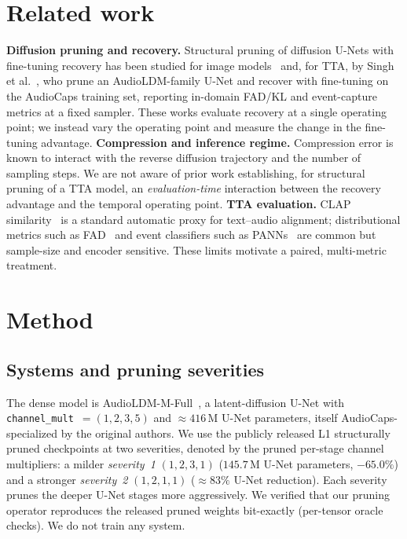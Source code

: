 \documentclass[conference]{IEEEtran}
\begin{document}
\section{Related work}
\textbf{Diffusion pruning and recovery.} Structural pruning of diffusion U-Nets with
fine-tuning recovery has been studied for image models~\cite{fang2023diffpruning,
kim2024bksdm} and, for TTA, by Singh et al.~\cite{singh2026pruning}, who prune an
AudioLDM-family U-Net and recover with fine-tuning on the AudioCaps training set, reporting
in-domain FAD/KL and event-capture metrics at a fixed sampler. These works evaluate
recovery at a single operating point; we instead vary the operating point and measure the
change in the fine-tuning advantage.
\textbf{Compression and inference regime.} Compression error is known to interact with the
reverse diffusion trajectory and the number of sampling steps. We are not aware of prior work
establishing, for structural pruning of a TTA model, an \emph{evaluation-time} interaction
between the recovery advantage and the temporal operating point.
\textbf{TTA evaluation.} CLAP similarity~\cite{wu2023clap} is a standard automatic proxy
for text--audio alignment; distributional metrics such as FAD~\cite{kilgour2019fad} and
event classifiers such as PANNs~\cite{kong2020panns} are common but sample-size and
encoder sensitive. These limits motivate a paired, multi-metric treatment.

\section{Method}
\subsection{Systems and pruning severities}
The dense model is AudioLDM-M-Full~\cite{liu2023audioldm}, a latent-diffusion U-Net with
\texttt{channel\_mult}~$=(1,2,3,5)$ and $\approx\!416$\,M U-Net parameters, itself AudioCaps-
specialized by the original authors. We use the publicly released L1 structurally pruned
checkpoints at two severities, denoted by the pruned per-stage channel multipliers: a
milder \emph{severity~1} $(1,2,3,1)$ ($145.7$\,M U-Net parameters, $-65.0\%$) and a stronger
\emph{severity~2} $(1,2,1,1)$ ($\approx\!83\%$ U-Net reduction). Each severity prunes the
deeper U-Net stages more aggressively. We verified that our pruning operator reproduces the
released pruned weights bit-exactly (per-tensor oracle checks). We do not train any system.
\end{document}
